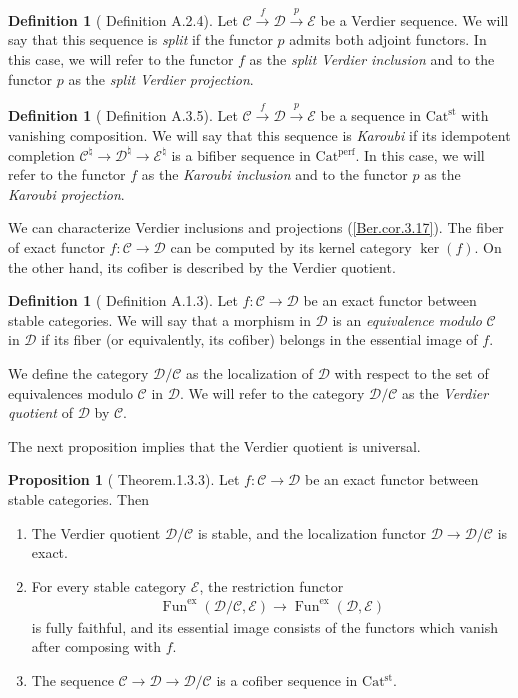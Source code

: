 \documentclass[a4paper,dvipdfmx,11pt,reqno]{amsart}
\DeclareMathOperator{\Fun}{Fun}
\newcommand{\C}{\mathcal{C}}
\newcommand{\D}{\mathcal{D}}
\newcommand{\E}{\mathcal{E}}
\newcommand{\Catperf}{\mathrm{Cat^{perf}}}
\newcommand{\Catst}{\mathrm{Cat^{st}}}
\theoremstyle{definition}
\newtheorem{definition}[theorem]{Definition}
\newtheorem{proposition}[theorem]{Proposition}
\begin{document}
\begin{definition}[\cite{CDH23} Definition A.2.4] \label{CDH23.def.A.2.4}
  Let $\C \xrightarrow{f} \D \xrightarrow{p} \E$ be a Verdier sequence.
  We will say that this sequence is \textit{split} if the functor $p$ admits both adjoint functors.
  In this case, we will refer to the functor $f$ as the \textit{split Verdier inclusion} and to the functor $p$ as the \textit{split Verdier projection}.
\end{definition}

\begin{definition}[\cite{CDH23} Definition A.3.5] \label{CDH23.def.A.3.5}
  Let $\C \xrightarrow{f} \D \xrightarrow{p} \E$ be a sequence in $\Catst$ with vanishing composition.
  We will say that this sequence is \textit{Karoubi} if its idempotent completion $\C^{\natural} \to \D^{\natural} \to \E^{\natural}$ is a bifiber sequence in $\Catperf$.
  In this case, we will refer to the functor $f$ as the \textit{Karoubi inclusion} and to the functor $p$ as the \textit{Karoubi projection}.
\end{definition}

We can characterize Verdier inclusions and projections (\cref{Ber.cor.3.17}).
The fiber of exact functor $f : \C \to \D$ can be computed by its kernel category $\ker(f)$.
On the other hand, its cofiber is described by the Verdier quotient.

\begin{definition}[\cite{CDH23} Definition A.1.3] \label{CDH23.def.A.1.3}
  Let $f : \C \to \D$ be an exact functor between stable categories.
  We will say that a morphism in $\D$ is an \textit{equivalence modulo} $\C$ in $\D$ if its fiber (or equivalently, its cofiber) belongs in the essential image of $f$.

  We define the category $\D/\C$ as the localization of $\D$ with respect to the set of equivalences modulo $\C$ in $\D$.
  We will refer to the category $\D/\C$ as the \textit{Verdier quotient} of $\D$ by $\C$.
\end{definition}

The next proposition implies that the Verdier quotient is universal.

\begin{proposition}[\cite{NS18} Theorem.1.3.3] \label{NS18.thrm.1.3.3}
  Let $f : \C \to \D$ be an exact functor between stable categories.
  Then
  \begin{enumerate}
    \item The Verdier quotient $\D/\C$ is stable, and the localization functor $\D \to \D/\C$ is exact.
    \item For every stable category $\E$, the restriction functor
    \begin{align*}
      \Fun^{\mathrm{ex}}(\D/\C,\E) \to \Fun^{\mathrm{ex}}(\D,\E)
    \end{align*}
    is fully faithful, and its essential image consists of the functors which vanish after composing with $f$.
    \item The sequence $\C \to \D \to \D/\C$ is a cofiber sequence in $\Catst$.
  \end{enumerate} 
\end{proposition}
\end{document}
